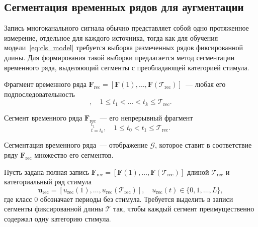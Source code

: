 \subsection{Сегментация временных рядов для аугментации}\label{sec3:cls_aug}

Запись многоканального сигнала обычно представляет собой одно протяженное измерение, отдельное для каждого источника, тогда как для обучения модели~\eqref{eq:cls_model} требуется выборка размеченных рядов фиксированной длины. Для формирования такой выборки предлагается метод сегментации временного ряда, выделяющий сегменты с преобладающей категорией стимула.

\begin{definition}
Фрагмент временного ряда $\mathbf{F}_{\mathrm{rec}} = [\mathbf{F}(1), \ldots, \mathbf{F}(\mathcal{T}_{\mathrm{rec}})]$~--- любая его подпоследовательность
\begin{equation*}
   [\mathbf{F}(t_1), \ldots, \mathbf{F}(t_k)], \quad 1 \leqslant t_1 < \ldots < t_k \leqslant \mathcal{T}_{\mathrm{rec}}.
\end{equation*}
\end{definition}

\begin{definition}
Сегмент временного ряда $\mathbf{F}_{\mathrm{rec}}$~--- его непрерывный фрагмент
\begin{equation*}
[\mathbf{F}(t)]_{t=t_0}^{t_1}, \quad 1 \leqslant t_0 < t_1 \leqslant \mathcal{T}_{\mathrm{rec}}.
\end{equation*}
\end{definition}

\begin{definition}
Сегментация временного ряда~--- отображение $\mathcal{G}$, которое ставит в соответствие ряду $\mathbf{F}_{\mathrm{rec}}$ множество его сегментов.
\end{definition}

Пусть задана полная запись $\mathbf{F}_{\mathrm{rec}} = [\mathbf{F}(1), \ldots, \mathbf{F}(\mathcal{T}_{\mathrm{rec}})]$ длиной $\mathcal{T}_{\mathrm{rec}}$ и категориальный ряд стимула
\begin{equation*}\mathbf{u}_{\mathrm{rec}} = [u_{\mathrm{rec}}(1), \ldots, u_{\mathrm{rec}}(\mathcal{T}_{\mathrm{rec}})], \quad u_{\mathrm{rec}}(t) \in \{0, 1, \dots, L\},
\end{equation*}
где класс $0$ обозначает периоды без стимула. Требуется выделить в записи сегменты фиксированной длины $\mathcal{T}$ так, чтобы каждый сегмент преимущественно содержал одну категорию стимула.

